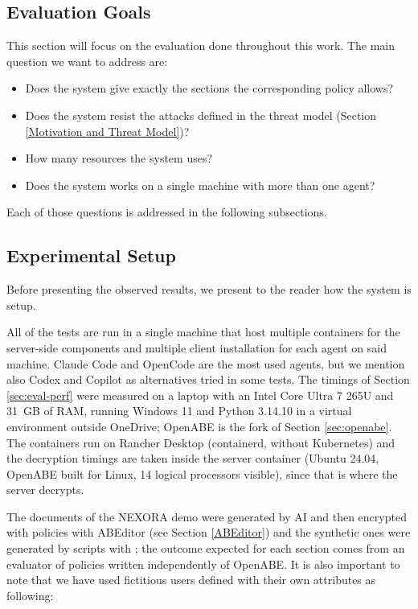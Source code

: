\subsection{Evaluation Goals}
This section will focus on the evaluation done throughout this work.
The main question we want to address are:
\begin{itemize}
  \item Does the system give exactly the sections the corresponding policy allows?
  \item Does the system resist the attacks defined in the threat model (Section \ref{Motivation and Threat Model})?
  \item How many resources the system uses?
  \item Does the system works on a single machine with more than one agent?
\end{itemize}
Each of those questions is addressed in the following subsections.

\subsection{Experimental Setup}
Before presenting the observed results, we present to the reader how the system is setup.

All of the tests are run in a single machine that host multiple containers for the server-side components and multiple client installation for each agent on said machine.
Claude Code and OpenCode are the most used agents, but we mention also Codex and Copilot as alternatives tried in some tests.
The timings of Section \ref{sec:eval-perf} were measured on a laptop with an Intel Core Ultra 7 265U and 31~GB of RAM, running Windows 11 and Python 3.14.10 in a virtual environment outside OneDrive; OpenABE is the fork of Section \ref{sec:openabe}.
The containers run on Rancher Desktop (containerd, without Kubernetes) and the decryption timings are taken inside the server container (Ubuntu 24.04, OpenABE built for Linux, 14 logical processors visible), since that is where the server decrypts.

The documents of the NEXORA demo were generated by AI and then encrypted with policies with ABEditor (see Section \ref{ABEditor}) and the synthetic ones were generated by scripts with ; the outcome expected for each section comes from an evaluator of policies written independently of OpenABE.
It is also important to note that we have used fictitious users defined with their own attributes as following:

